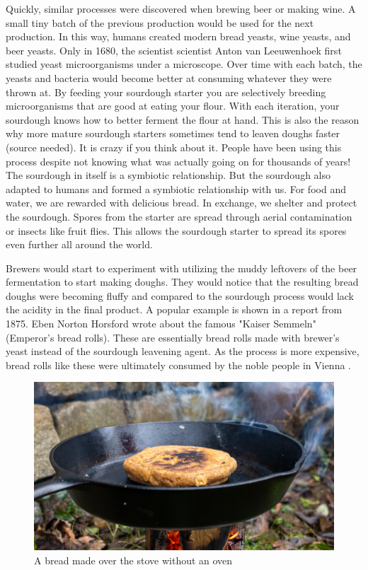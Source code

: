 Quickly, similar processes were discovered when brewing beer
or making wine. A small tiny batch of the previous production
would be used for the next production. In this way, humans created
modern bread yeasts, wine yeasts, and beer yeasts. Only in 1680,
the scientist scientist Anton van Leeuwenhoek first studied yeast microorganisms
under a microscope. Over time with each batch, the yeasts and bacteria
would become better at consuming whatever they were thrown at.
By feeding your sourdough starter you are selectively breeding
microorganisms that are good at eating your flour. With
each iteration, your sourdough knows how to better ferment the flour
at hand. This is also the reason why more mature sourdough starters sometimes
tend to leaven doughs faster (source needed). It is crazy if you
think about it. People have been using this process despite not
knowing what was actually going on for thousands of years! The
sourdough in itself is a symbiotic relationship. But the sourdough
also adapted to humans and formed a symbiotic relationship with us.
For food and water, we are rewarded with delicious bread. In exchange,
we shelter and protect the sourdough. Spores from the starter
are spread through aerial contamination or insects like fruit flies.
This allows the sourdough starter to spread its spores even
further all around the world. 

Brewers would start to experiment with utilizing the muddy leftovers
of the beer fermentation to start making doughs. They would notice
that the resulting bread doughs were becoming fluffy and compared
to the sourdough process would lack the acidity in the final product.
A popular example is shown in a report from 1875. Eben Norton Horsford
wrote about the famous "Kaiser Semmeln" (Emperor's bread rolls).
These are essentially bread rolls made with brewer's yeast instead
of the sourdough leavening agent. As the process is more expensive,
bread rolls like these were ultimately consumed by the noble people
in Vienna \cite{vienna+breadrolls}.

\begin{figure}[h]
  \includegraphics[width=\textwidth]{sourdough-stove}
  \caption{A bread made over the stove without an oven}
  \label{sourdough-stove}
\end{figure}

